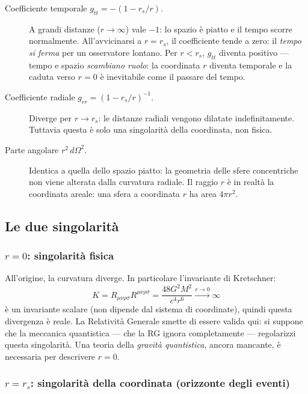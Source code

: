 \documentclass[12pt, a4paper, twoside]{article}
\theoremstyle{definition}
\newcommand{\RS}{r_{\!s}}          %
\begin{document}
\begin{description}
  \item[Coefficiente temporale $g_{tt} = -(1-\RS/r)$.]
    A grandi distanze ($r \to \infty$) vale $-1$: lo spazio è piatto e il
    tempo scorre normalmente. All'avvicinarsi a $r = \RS$, il coefficiente
    tende a zero: il \emph{tempo si ferma} per un osservatore lontano.
    Per $r < \RS$, $g_{tt}$ diventa positivo — tempo e spazio \emph{scambiano
    ruolo}: la coordinata $r$ diventa temporale e la caduta verso $r=0$
    è inevitabile come il passare del tempo.

  \item[Coefficiente radiale $g_{rr} = (1-\RS/r)^{-1}$.]
    Diverge per $r \to \RS$: le distanze radiali vengono dilatate
    indefinitamente. Tuttavia questa è solo una singolarità della coordinata,
    non fisica.

  \item[Parte angolare $r^2\,d\Omega^2$.]
    Identica a quella dello spazio piatto: la geometria delle sfere concentriche
    non viene alterata dalla curvatura radiale. Il raggio $r$ è in realtà la
    coordinata areale: una sfera a coordinata $r$ ha area $4\pi r^2$.
\end{description}

\subsection{Le due singolarità}

\subsubsection{$r = 0$: singolarità fisica}

All'origine, la curvatura diverge. In particolare l'invariante di Kretschner:
\begin{equation}
  K = R_{\mu\nu\rho\sigma}R^{\mu\nu\rho\sigma}
  = \frac{48 G^2 M^2}{c^4 r^6} \xrightarrow{r\to 0} \infty
\end{equation}
è un invariante scalare (non dipende dal sistema di coordinate), quindi questa
divergenza è reale. La Relatività Generale smette di essere valida qui: si
suppone che la meccanica quantistica — che la RG ignora completamente —
regolarizzi questa singolarità. Una teoria della \emph{gravità quantistica},
ancora mancante, è necessaria per descrivere $r = 0$.

\subsubsection{$r = \RS$: singolarità della coordinata (orizzonte degli eventi)}
\end{document}
